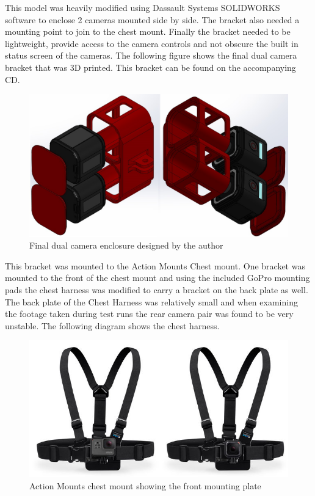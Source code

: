 This model was heavily modified using Dassault Systems SOLIDWORKS software to enclose 2 cameras mounted side by side. The bracket also needed a mounting point to join to the chest mount. Finally the bracket needed to be lightweight, provide access to the camera controls and not obscure the built in status screen of the cameras. The following figure shows the final dual camera bracket that was 3D printed. This bracket can be found on the accompanying CD.

\begin{figure}[!ht] 
\captionsetup{width=0.8\linewidth, font=small}  
\includegraphics[width=0.8\linewidth]{figures/stereoholder.JPG}
\caption{Final dual camera enclosure designed by the author}
\label{fig:stereoholder}
\end{figure}

This bracket was mounted to the Action Mounts Chest mount. One bracket was mounted to the front of the chest mount and using the included GoPro mounting pads the chest harness was modified to carry a bracket on the back plate as well. The back plate of the Chest Harness was relatively small and when examining the footage taken during test runs the rear camera pair was found to be very unstable. The following diagram shows the chest harness.

\begin{figure}[!ht] 
\captionsetup{width=0.6\linewidth, font=small}  
\includegraphics[width=0.6\linewidth]{figures/chesty.png}
\caption{Action Mounts chest mount showing the front mounting plate}
\label{fig:chesty}
\end{figure}

